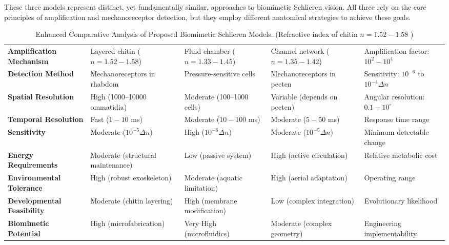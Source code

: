 \documentclass[11pt]{article}
\begin{document}
These three models represent distinct, yet fundamentally similar, approaches to biomimetic Schlieren vision. All three rely on the core principles of amplification and mechanoreceptor detection, but they employ different anatomical strategies to achieve these goals.

\begin{table}[htbp]
\centering
\caption{Enhanced Comparative Analysis of Proposed Biomimetic Schlieren Models. (Refractive index of chitin $n=1.52-1.58$ \cite{Tsai2008ChitinOptical})}
\label{tab:enhanced_comparative}
\scriptsize
\begin{tabularx}{\textwidth}{@{}L L L L L@{}}
\toprule
{} &  &  &  &  \\
\midrule
\textbf{Amplification Mechanism} & Layered chitin ($n=1.52-1.58$) & Fluid chamber ($n=1.33-1.45$) & Channel network ($n=1.35-1.42$) & Amplification factor: $10^2-10^4$ \\
\addlinespace %
\textbf{Detection Method} & Mechanoreceptors in rhabdom & Pressure-sensitive cells & Mechanoreceptors in pecten & Sensitivity: $10^{-6}$ to $10^{-4} \Delta n$ \\
\addlinespace %

\textbf{Spatial Resolution} & High (\num{1000}--\num{10000} ommatidia) & Moderate (\num{100}--\num{1000} cells) & Variable (depends on pecten) & Angular resolution: $0.1-10^\circ$ \\
\addlinespace %

\textbf{Temporal Resolution} & Fast ($1-10$ ms) & Moderate ($10-100$ ms) & Moderate ($5-50$ ms) & Response time range \\
\addlinespace %

\textbf{Sensitivity} & Moderate ($10^{-5} \Delta n$) & High ($10^{-6} \Delta n$) & Moderate ($10^{-5} \Delta n$) & Minimum detectable change \\
\addlinespace %

\textbf{Energy Requirements} & Moderate (structural maintenance) & Low (passive system) & High (active circulation) & Relative metabolic cost \\
\addlinespace %

\textbf{Environmental Tolerance} & High (robust exoskeleton) & Moderate (aquatic limitation) & High (aerial adaptation) & Operating range \\
\addlinespace %

\textbf{Developmental Feasibility} & Moderate (chitin layering) & High (membrane modification) & Low (complex integration) & Evolutionary likelihood \\
\addlinespace %

\textbf{Biomimetic Potential} & High (microfabrication) & Very High (microfluidics) & Moderate (complex geometry) & Engineering implementability \\
\bottomrule
\end{tabularx}
\end{table}
\end{document}
